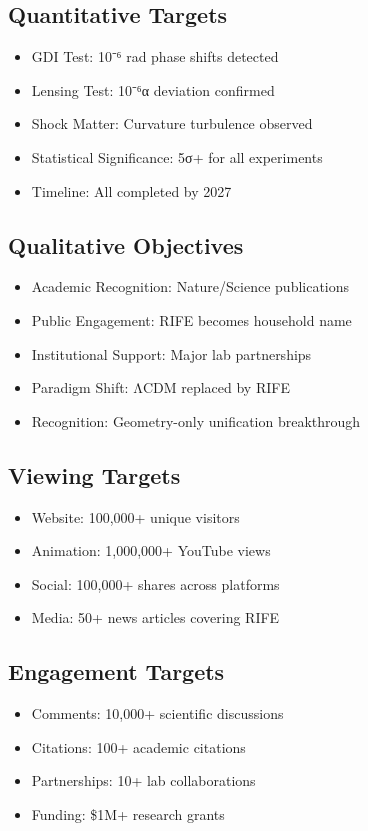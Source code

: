 \documentclass[11pt]{report}
\begin{document}
\subsection{Quantitative Targets}
\begin{itemize}
\item GDI Test: 10⁻⁶ rad phase shifts detected
\item Lensing Test: 10⁻⁶α deviation confirmed
\item Shock Matter: Curvature turbulence observed
\item Statistical Significance: 5σ+ for all experiments
\item Timeline: All completed by 2027
\end{itemize}

\subsection{Qualitative Objectives}
\begin{itemize}
\item Academic Recognition: Nature/Science publications
\item Public Engagement: RIFE becomes household name
\item Institutional Support: Major lab partnerships
\item Paradigm Shift: ΛCDM replaced by RIFE
\item Recognition: Geometry-only unification breakthrough
\end{itemize}

\subsection{Viewing Targets}
\begin{itemize}
\item Website: 100,000+ unique visitors
\item Animation: 1,000,000+ YouTube views
\item Social: 100,000+ shares across platforms
\item Media: 50+ news articles covering RIFE
\end{itemize}

\subsection{Engagement Targets}
\begin{itemize}
\item Comments: 10,000+ scientific discussions
\item Citations: 100+ academic citations
\item Partnerships: 10+ lab collaborations
\item Funding: \$1M+ research grants
\end{itemize}
\end{document}
